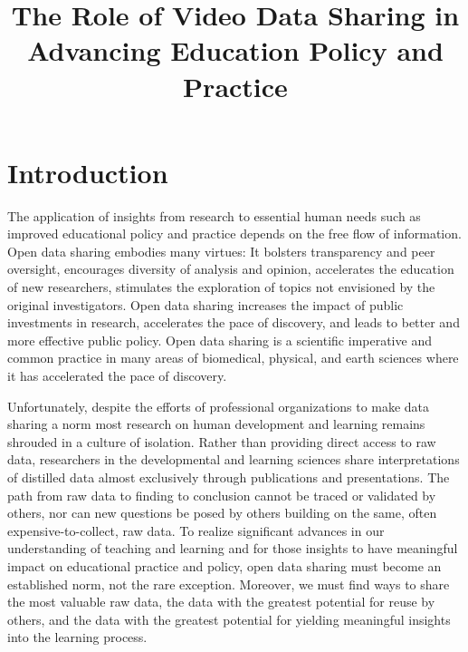 \documentclass[letterpaper,man,apacite]{apa6}
\title{The Role of Video Data Sharing in Advancing Education Policy and Practice}
\begin{document}
\maketitle

\section{Introduction}

The application of insights from research to essential human needs such as improved educational policy and practice depends on the free flow of information. 
Open data sharing embodies many virtues: It bolsters transparency and peer oversight, encourages diversity of analysis and opinion, accelerates the education of new researchers, stimulates the exploration of topics not envisioned by the original investigators.
Open data sharing increases the impact of public investments in research, accelerates the pace of discovery, and leads to better and more effective public policy.
Open data sharing is a scientific imperative and common practice in many areas of biomedical, physical, and earth sciences where it has accelerated the pace of discovery.

Unfortunately, despite the efforts of professional organizations to make data sharing a norm \cite{AERA-Code-2011} most research on human development and learning remains shrouded in a culture of isolation. 
Rather than providing direct access to raw data, researchers in the developmental and learning sciences share interpretations of distilled data almost exclusively through publications and presentations.
The path from raw data to finding to conclusion cannot be traced or validated by others, nor can new questions be posed by others building on the same, often expensive-to-collect, raw data.
To realize significant advances in our understanding of teaching and learning and for those insights to have meaningful impact on educational practice and policy, open data sharing must become an established norm, not the rare exception.
Moreover, we must find ways to share the most valuable raw data, the data with the greatest potential for reuse by others, and the data with the greatest potential for yielding meaningful insights into the learning process.
\end{document}
